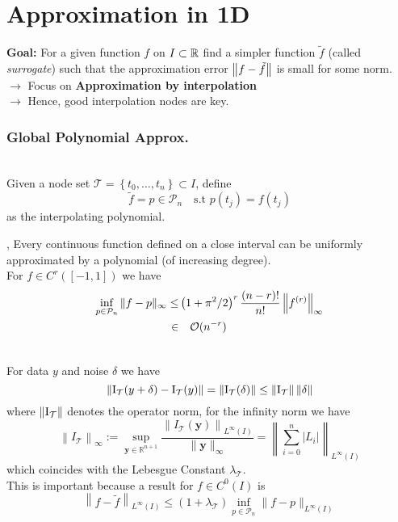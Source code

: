 \columnbreak
\part{Approximation in 1D}
\setcounter{section}{0}

\textbf{Goal:} For a given function $f$ on $I \subset \mathbb{R}$ find a simpler function $\tilde{f}$ (called \textit{surrogate}) such that the approximation error $\left\lVert f-\tilde{f} \right\rVert$ is small for some norm.\\

$\longrightarrow$ Focus on \textbf{Approximation by interpolation}\\
$\longrightarrow$ Hence, good interpolation nodes are key.

\section{Global Polynomial Approx.}

 \\
Given a node set $\mathcal{T}=\left\{t_{0}, \ldots, t_{n}\right\} \subset I$, define 
$$\tilde{f} = p \in \mathcal{P}_n \quad \text{s.t } p(t_j)=f(t_j)$$ as the interpolating polynomial.

\sep
\Theorem[Weierstrass] Every continuous function defined on a close interval can be uniformly approximated by a polynomial (of increasing degree). \\

 For $f \in C^r([-1,1])$ we have
\begin{align*}
	\inf _{p \in \mathcal{P}_{n}}\|f-p\|_{\infty} \leq &  \left(1+\pi^{2} / 2\right)^{r} \frac{(n-r) !}{n !}\left\|f^{(r)}\right\|_{\infty} \\
	\in & \quad \mathcal{O}(n^{-r})
\end{align*}

 \\
For data $y$ and noise $\delta$ we have
$$
  \left\lVert \mathrm{I}_{\mathcal{T}}(y + \delta) - \mathrm{I}_{\mathcal{T}}(y) \right\rVert = 
  \left\lVert \mathrm{I}_{\mathcal{T}}(\delta) \right\rVert \leq
  \left\lVert \mathrm{I}_{\mathcal{T}} \right\rVert\left\lVert \delta \right\rVert
$$
where $\left\lVert \mathrm{I}_{\mathcal{T}} \right\rVert$ denotes the operator norm, for the infinity norm we have
$$
\left\|I_{\mathcal{T}}\right\|_{\infty}:=\sup _{\mathbf{y} \in \mathbb{R}^{n+1}} \frac{\left\|I_{\mathcal{T}}(\mathbf{y})\right\|_{L^{\infty}(I)}}{\|\mathbf{y}\|_{\infty}}=\left\|\sum_{i=0}^{n}\left|L_{i}\right|\right\|_{L^{\infty}(I)}
$$
which coincides with the Lebesgue Constant $\lambda_\mathcal{T}$. \\
This is important because a result for $f\in C^0(I)$ is
$$
\left\|f-\tilde f\right\|_{L^{\infty}(I)} \leq\left(1+\lambda_{\mathcal{T}}\right) \inf _{p \in \mathcal{P}_{n}}\|f-p\|_{L^{\infty}(I)}
$$

